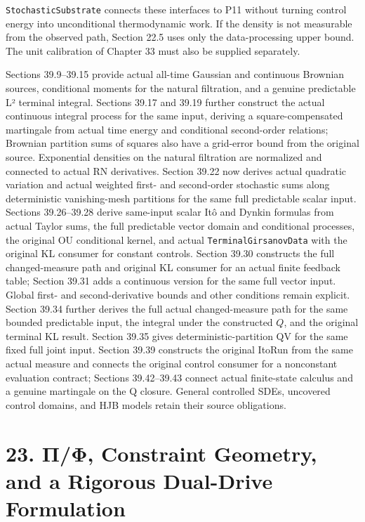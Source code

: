 \documentclass[
  english,
  11pt,
  oneside]{book}
\begin{document}
\nolinkurl{StochasticSubstrate} connects these interfaces to P11 without turning control energy into unconditional thermodynamic work. If the density is not measurable from the observed path, Section 22.5 uses only the data-processing upper bound. The unit calibration of Chapter 33 must also be supplied separately.

Sections 39.9--39.15 provide actual all-time Gaussian and continuous Brownian sources, conditional moments for the natural filtration, and a genuine predictable L² terminal integral. Sections 39.17 and 39.19 further construct the actual continuous integral process for the same input, deriving a square-compensated martingale from actual time energy and conditional second-order relations; Brownian partition sums of squares also have a grid-error bound from the original source. Exponential densities on the natural filtration are normalized and connected to actual RN derivatives. Section 39.22 now derives actual quadratic variation and actual weighted first- and second-order stochastic sums along deterministic vanishing-mesh partitions for the same full predictable scalar input. Sections 39.26--39.28 derive same-input scalar Itô and Dynkin formulas from actual Taylor sums, the full predictable vector domain and conditional processes, the original OU conditional kernel, and actual \nolinkurl{TerminalGirsanovData} with the original KL consumer for constant controls. Section 39.30 constructs the full changed-measure path and original KL consumer for an actual finite feedback table; Section 39.31 adds a continuous version for the same full vector input. Global first- and second-derivative bounds and other conditions remain explicit. Section 39.34 further derives the full actual changed-measure path for the same bounded predictable input, the integral under the constructed \(Q\), and the original terminal KL result. Section 39.35 gives deterministic-partition QV for the same fixed full joint input. Section 39.39 constructs the original ItoRun from the same actual measure and connects the original control consumer for a nonconstant evaluation contract; Sections 39.42--39.43 connect actual finite-state calculus and a genuine martingale on the Q closure. General controlled SDEs, uncovered control domains, and HJB models retain their source obligations.

\chapter{23. Π/Φ, Constraint Geometry, and a Rigorous Dual-Drive Formulation}\label{ch-23}
\end{document}
